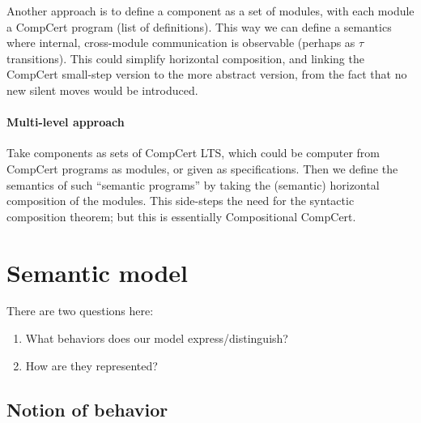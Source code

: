 \documentclass[11pt]{article}
\begin{document}
Another approach is to define a component as a set of modules,
with each module a CompCert program (list of definitions).
This way we can define a semantics where
internal, cross-module communication is observable
(perhaps as $\tau$ transitions).
This could simplify horizontal composition,
and linking the CompCert small-step version
to the more abstract version,
from the fact that no new silent moves
would be introduced.


\paragraph{Multi-level approach} %

Take components as sets of CompCert LTS,
which could be computer from CompCert programs as modules,
or given as specifications.
Then we define the semantics of such
``semantic programs'' by taking the (semantic)
horizontal composition of the modules.
This side-steps the need for the syntactic composition theorem;
but this is essentially Compositional CompCert.



\section{Semantic model} %

There are two questions here:
\begin{enumerate}
\item What behaviors does our model express/distinguish?
\item How are they represented?
\end{enumerate}

\subsection{Notion of behavior} %
\end{document}
